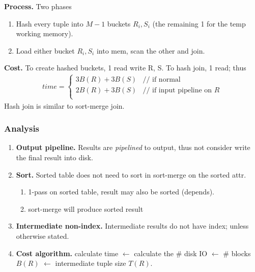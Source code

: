 \documentclass[a4paper]{report}
\begin{document}
\begin{enumerate}
\textbf{Process.} Two phases
\begin{enumerate}
\item Hash every tuple into $M-1$ buckets $R_i, S_i$ (the remaining 1 for the temp working memory).
\item Load either bucket $R_i, S_i$ into mem, scan the other and join.
\end{enumerate}
\textbf{Cost.} To create hashed buckets, 1 read write R, S. To hash join, 1 read; thus
\begin{eqnarray*}
time = \left\{ \begin{array}{rl}
  3B(R)+3B(S) &\text{// if normal} \\
  2B(R)+3B(S) &\text{// if input pipeline on $R$}\\
       \end{array} \right.
\end{eqnarray*}
Hash join is similar to sort-merge join.
\end{enumerate}

\subsubsection{Analysis}
\begin{enumerate}
\item \textbf{Output pipeline.} Results are \textit{pipelined} to output, thus not consider write the final result into disk.
\item \textbf{Sort.} Sorted table does not need to sort in sort-merge on the sorted attr.
\begin{enumerate}
\item 1-pass on sorted table, result may also be sorted (depends).
\item sort-merge will produce sorted result
\end{enumerate}
\item \textbf{Intermediate non-index.} Intermediate results do not have index; unless otherwise stated.
\item \textbf{Cost algorithm.} calculate time $\leftarrow$ calculate the \# disk IO $\leftarrow$ \# blocks $B(R)$ $\leftarrow$ intermediate tuple size $T(R)$.
\end{enumerate}
\end{document}
